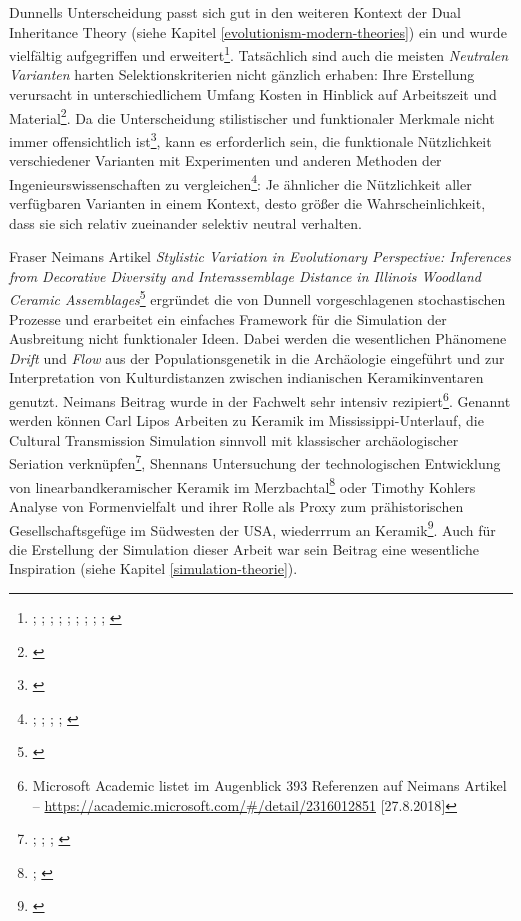 \documentclass[openany,twoside,twocolumn]{book}
\let\rmarkdownfootnote\footnote%
\def\footnote{\protect\rmarkdownfootnote}
\begin{document}
Dunnells Unterscheidung passt sich gut in den weiteren Kontext der Dual
Inheritance Theory (siehe Kapitel \ref{evolutionism-modern-theories})
ein und wurde vielfältig aufgegriffen und erweitert\footnote{\textcite{lipo_population_1997};
  \textcite{lipo_science_2001}; \textcite{lyman_measuring_2000};
  \textcite{neiman_conspicuous_1997-1};
  \textcite{neiman_stylistic_1995}; \textcite{rindos_darwinian_1985};
  \textcite{rindos_undirected_1989}; \textcite{rogers_natural_2008};
  \textcite{shennan_ceramic_2001}; \textcite{teltser_culture_1995}}.
Tatsächlich sind auch die meisten \emph{Neutralen Varianten} harten
Selektionskriterien nicht gänzlich erhaben: Ihre Erstellung verursacht
in unterschiedlichem Umfang Kosten in Hinblick auf Arbeitszeit und
Material\footnote{\textcite{meltzer_study_1981}}. Da die Unterscheidung
stilistischer und funktionaler Merkmale nicht immer offensichtlich
ist\footnote{\textcite{bettinger_style_1996}}, kann es erforderlich
sein, die funktionale Nützlichkeit verschiedener Varianten mit
Experimenten und anderen Methoden der Ingenieurswissenschaften zu
vergleichen\footnote{\textcite{kornbacher_building_2001};
  \textcite{obrien_evolutionary_1994}; \textcite{obrien_variation_1990};
  \textcite{pfeffer_engineering_2001-1};
  \textcite{wilhelmsen_building_2001}}: Je ähnlicher die Nützlichkeit
aller verfügbaren Varianten in einem Kontext, desto größer die
Wahrscheinlichkeit, dass sie sich relativ zueinander selektiv neutral
verhalten.

Fraser Neimans Artikel \emph{Stylistic Variation in Evolutionary
Perspective: Inferences from Decorative Diversity and Interassemblage
Distance in Illinois Woodland Ceramic Assemblages}\footnote{\textcite{neiman_stylistic_1995}}
ergründet die von Dunnell vorgeschlagenen stochastischen Prozesse und
erarbeitet ein einfaches Framework für die Simulation der Ausbreitung
nicht funktionaler Ideen. Dabei werden die wesentlichen Phänomene
\emph{Drift} und \emph{Flow} aus der Populationsgenetik in die
Archäologie eingeführt und zur Interpretation von Kulturdistanzen
zwischen indianischen Keramikinventaren genutzt. Neimans Beitrag wurde
in der Fachwelt sehr intensiv rezipiert\footnote{Microsoft Academic
  listet im Augenblick 393 Referenzen auf Neimans Artikel --
  \url{https://academic.microsoft.com/\#/detail/2316012851}
  {[}27.8.2018{]}}. Genannt werden können Carl Lipos Arbeiten zu Keramik
im Mississippi-Unterlauf, die Cultural Transmission Simulation sinnvoll
mit klassischer archäologischer Seriation verknüpfen\footnote{\textcite{lipo_community_2001};
  \textcite{lipo_neutralitystyle_2001}; \textcite{lipo_population_1997};
  \textcite{lipo_science_2001}}, Shennans Untersuchung der
technologischen Entwicklung von linearbandkeramischer Keramik im
Merzbachtal\footnote{\textcite{bentley_cultural_2003};
  \textcite{shennan_ceramic_2001}} oder Timothy Kohlers Analyse von
Formenvielfalt und ihrer Rolle als Proxy zum prähistorischen
Gesellschaftsgefüge im Südwesten der USA, wiederrrum an
Keramik\footnote{\textcite{kohler_vessels_2004-1}}. Auch für die
Erstellung der Simulation dieser Arbeit war sein Beitrag eine
wesentliche Inspiration (siehe Kapitel \ref{simulation-theorie}).
\end{document}
